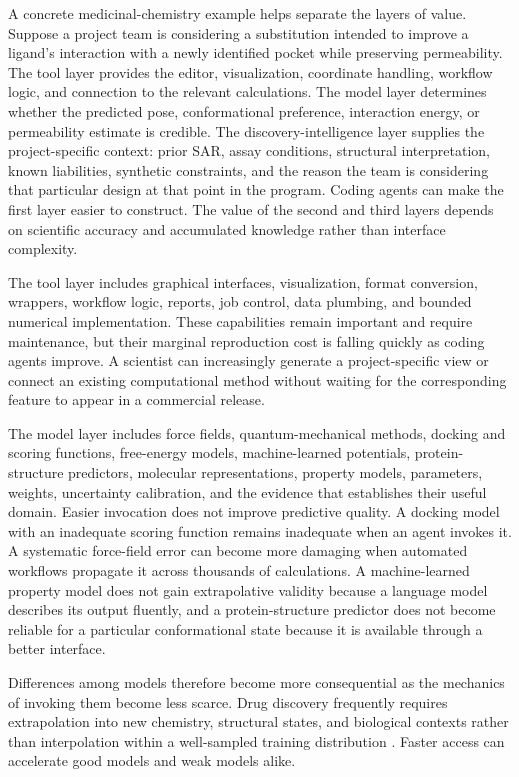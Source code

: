 \documentclass[11pt]{article}
\begin{document}
A concrete medicinal-chemistry example helps separate the layers of value. Suppose a project team is considering a substitution intended to improve a ligand's interaction with a newly identified pocket while preserving permeability. The tool layer provides the editor, visualization, coordinate handling, workflow logic, and connection to the relevant calculations. The model layer determines whether the predicted pose, conformational preference, interaction energy, or permeability estimate is credible. The discovery-intelligence layer supplies the project-specific context: prior SAR, assay conditions, structural interpretation, known liabilities, synthetic constraints, and the reason the team is considering that particular design at that point in the program. Coding agents can make the first layer easier to construct. The value of the second and third layers depends on scientific accuracy and accumulated knowledge rather than interface complexity.

The tool layer includes graphical interfaces, visualization, format conversion, wrappers, workflow logic, reports, job control, data plumbing, and bounded numerical implementation. These capabilities remain important and require maintenance, but their marginal reproduction cost is falling quickly as coding agents improve. A scientist can increasingly generate a project-specific view or connect an existing computational method without waiting for the corresponding feature to appear in a commercial release.

The model layer includes force fields, quantum-mechanical methods, docking and scoring functions, free-energy models, machine-learned potentials, protein-structure predictors, molecular representations, property models, parameters, weights, uncertainty calibration, and the evidence that establishes their useful domain. Easier invocation does not improve predictive quality. A docking model with an inadequate scoring function remains inadequate when an agent invokes it. A systematic force-field error can become more damaging when automated workflows propagate it across thousands of calculations. A machine-learned property model does not gain extrapolative validity because a language model describes its output fluently, and a protein-structure predictor does not become reliable for a particular conformational state because it is available through a better interface.

Differences among models therefore become more consequential as the mechanics of invoking them become less scarce. Drug discovery frequently requires extrapolation into new chemistry, structural states, and biological contexts rather than interpolation within a well-sampled training distribution \citep{bender2021realistic1,bender2021realistic2,wigh2022representations}. Faster access can accelerate good models and weak models alike.
\end{document}
